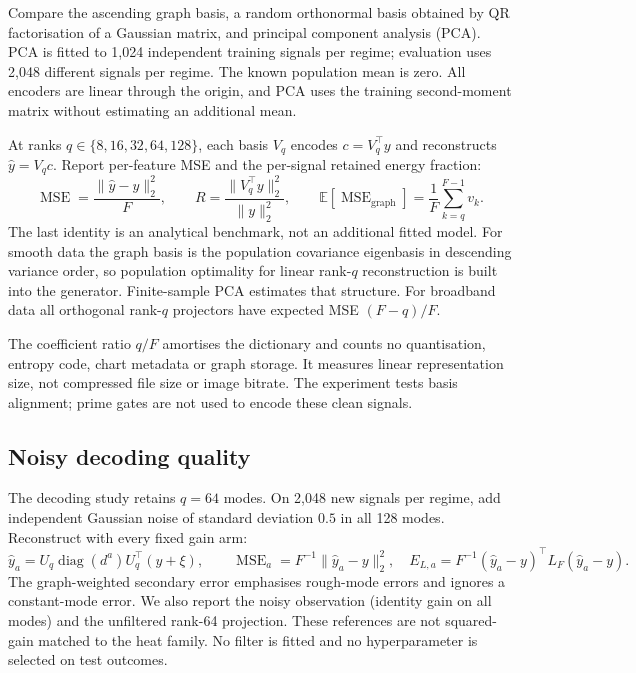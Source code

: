 \documentclass[10pt]{article}
\newcommand{\Lf}{L_F}
\newcommand{\Uq}{U_q}
\newcommand{\diag}{\operatorname{diag}}
\newcommand{\E}{\mathbb{E}}
\newcommand{\MSE}{\operatorname{MSE}}
\begin{document}
Compare the ascending graph basis, a random orthonormal basis obtained
by QR factorisation of a Gaussian matrix, and principal component
analysis (PCA). PCA is fitted to 1,024 independent training signals per
regime; evaluation uses 2,048 different signals per regime. The known
population mean is zero. All encoders are linear through the origin,
and PCA uses the training second-moment matrix without estimating an
additional mean.

At ranks $q\in\{8,16,32,64,128\}$, each basis $V_q$ encodes
$c=V_q^\top y$ and reconstructs $\widehat y=V_qc$.
Report per-feature MSE and the per-signal retained energy fraction:
\begin{equation}
 \MSE=\frac{\|\widehat y-y\|_2^2}{F},\qquad
 R=\frac{\|V_q^\top y\|_2^2}{\|y\|_2^2},\qquad
 \E[\MSE_{\mathrm{graph}}]=\frac1F\sum_{k=q}^{F-1}v_k.
 \label{eq:encoding}
\end{equation}
The last identity is an analytical benchmark, not an additional fitted
model. For smooth data the graph basis is the population covariance
eigenbasis in descending variance order, so population optimality for
linear rank-$q$ reconstruction is built into the generator. Finite-sample
PCA estimates that structure. For broadband data all orthogonal rank-$q$
projectors have expected MSE $(F-q)/F$.

The coefficient ratio $q/F$ amortises the dictionary and counts no
quantisation, entropy code, chart metadata or graph storage. It measures
linear representation size, not compressed file size or image bitrate.
The experiment tests basis alignment; prime gates are not used to
encode these clean signals.

\subsection{Noisy decoding quality}

The decoding study retains $q=64$ modes. On 2,048 new signals per regime,
add independent Gaussian noise of standard deviation $0.5$ in all
128 modes. Reconstruct with every fixed gain arm:
\begin{equation}
 \widehat y_a=
 \Uq\diag(d^a)\Uq^\top(y+\xi),\qquad
 \MSE_a=F^{-1}\|\widehat y_a-y\|_2^2,\quad
 E_{L,a}=F^{-1}(\widehat y_a-y)^\top\Lf(\widehat y_a-y).
 \label{eq:decoding}
\end{equation}
The graph-weighted secondary error emphasises rough-mode errors and
ignores a constant-mode error. We also report the noisy observation
(identity gain on all modes) and the unfiltered rank-64 projection.
These references are not squared-gain matched to the heat family.
No filter is fitted and no hyperparameter is selected on test outcomes.
\end{document}
